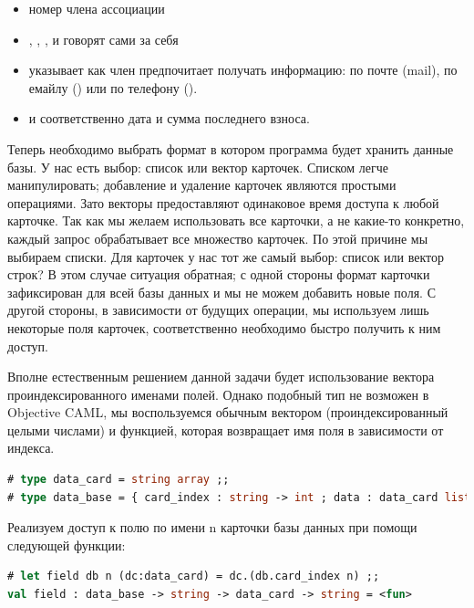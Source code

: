 \begin{itemize}
	\item {} номер члена ассоциации

	\item {}, , ,  и 
 говорят сами за себя
	
	\item {} указывает как член предпочитает получать информацию: по 
почте (mail), по емайлу () или по телефону ().
	
	\item {} и  соответственно дата и сумма последнего 
взноса.
\end{itemize}

Теперь необходимо выбрать формат в котором программа будет хранить данные базы. 
У нас есть выбор: список или вектор карточек. Списком легче манипулировать; 
добавление и удаление карточек являются простыми операциями. Зато векторы 
предоставляют одинаковое время доступа к любой карточке. Так как мы желаем 
использовать все карточки, а не какие-то конкретно, каждый запрос обрабатывает 
все множество карточек. По этой причине мы выбираем списки. Для карточек у нас 
тот же самый выбор: список или вектор строк? В этом случае ситуация обратная; с 
одной стороны формат карточки зафиксирован для всей базы данных и мы не можем 
добавить новые поля. С другой стороны, в зависимости от будущих операции, мы 
используем лишь некоторые поля карточек, соответственно необходимо быстро 
получить к ним доступ.

Вполне естественным решением данной задачи будет использование вектора 
проиндексированного именами полей. Однако подобный тип не возможен в Objective 
CAML, мы воспользуемся обычным вектором (проиндексированный целыми числами) и 
функцией, которая возвращает имя поля в зависимости от индекса.

\begin{lstlisting}[language=OCaml]
# type data_card = string array ;;
# type data_base = { card_index : string -> int ; data : data_card list } ;;
\end{lstlisting}

Реализуем доступ к полю по имени n карточки  базы данных  при 
помощи следующей функции:

\begin{lstlisting}[language=OCaml]
# let field db n (dc:data_card) = dc.(db.card_index n) ;;
val field : data_base -> string -> data_card -> string = <fun>
\end{lstlisting}

